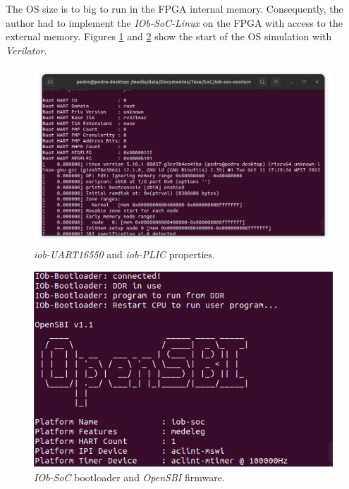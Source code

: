 The OS size is to big to run in the FPGA internal memory. Consequently, the author had to implement the \textit{IOb-SoC-Linux} on the FPGA with access to the external memory. Figures \ref{fig:start_bootloader_sim} and \ref{fig:end_bootloader_sim} show the start of the OS simulation with \textit{Verilator}.

\begin{figure}[!ht]
    \centering
    \includegraphics[width=\linewidth]{../images/start_Linux_sim.png}
    \caption{\textit{iob-UART16550} and \textit{iob-PLIC} properties.}
    \label{fig:start_bootloader_sim}
\end{figure}
\begin{figure}[!ht]
    \centering
    \includegraphics[width=\linewidth]{../images/end_bootloader_sim.png}
    \caption{\textit{IOb-SoC} bootloader and \textit{OpenSBI} firmware.}
    \label{fig:end_bootloader_sim}
\end{figure}


